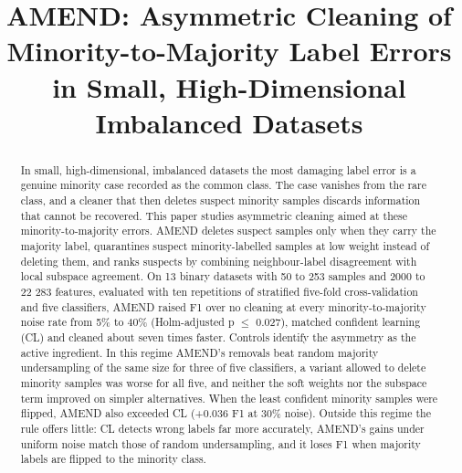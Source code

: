 \documentclass[conference]{IEEEtran}
\begin{document}
\title{AMEND: Asymmetric Cleaning of Minority-to-Majority Label Errors in Small, High-Dimensional Imbalanced Datasets}

\author{
\and
{}
\and
{}
}

\maketitle

\begin{abstract}
In small, high-dimensional, imbalanced datasets the most damaging label error is a genuine minority case recorded as the common class. The case vanishes from the rare class, and a cleaner that then deletes suspect minority samples discards information that cannot be recovered. This paper studies asymmetric cleaning aimed at these minority-to-majority errors. AMEND deletes suspect samples only when they carry the majority label, quarantines suspect minority-labelled samples at low weight instead of deleting them, and ranks suspects by combining neighbour-label disagreement with local subspace agreement. On 13 binary datasets with 50 to 253 samples and 2000 to 22 283 features, evaluated with ten repetitions of stratified five-fold cross-validation and five classifiers, AMEND raised F1 over no cleaning at every minority-to-majority noise rate from 5\% to 40\% (Holm-adjusted p $\le $ 0.027), matched confident learning (CL) and cleaned about seven times faster. Controls identify the asymmetry as the active ingredient. In this regime AMEND's removals beat random majority undersampling of the same size for three of five classifiers, a variant allowed to delete minority samples was worse for all five, and neither the soft weights nor the subspace term improved on simpler alternatives. When the least confident minority samples were flipped, AMEND also exceeded CL (+0.036 F1 at 30\% noise). Outside this regime the rule offers little: CL detects wrong labels far more accurately, AMEND's gains under uniform noise match those of random undersampling, and it loses F1 when majority labels are flipped to the minority class.
\end{abstract}
\end{document}
